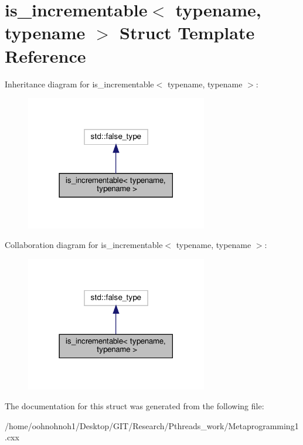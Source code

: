 \hypertarget{structis__incrementable}{}\section{is\+\_\+incrementable$<$ typename, typename $>$ Struct Template Reference}
\label{structis__incrementable}


Inheritance diagram for is\+\_\+incrementable$<$ typename, typename $>$\+:
\nopagebreak
\begin{figure}[H]
\begin{center}
\leavevmode
\includegraphics[width=225pt]{structis__incrementable__inherit__graph}
\end{center}
\end{figure}


Collaboration diagram for is\+\_\+incrementable$<$ typename, typename $>$\+:
\nopagebreak
\begin{figure}[H]
\begin{center}
\leavevmode
\includegraphics[width=225pt]{structis__incrementable__coll__graph}
\end{center}
\end{figure}


The documentation for this struct was generated from the following file\+:\begin{DoxyCompactItemize}
\item 
/home/oohnohnoh1/\+Desktop/\+G\+I\+T/\+Research/\+Pthreads\+\_\+work/Metaprogramming1.\+cxx\end{DoxyCompactItemize}

